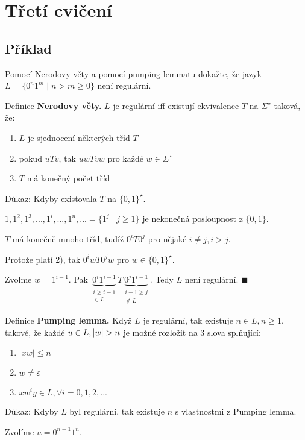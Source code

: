\section{Třetí cvičení}

\subsection{Příklad}
Pomocí Nerodovy věty a pomocí pumping lemmatu dokažte, že jazyk $L = \{0^n 1^m \mid n > m \geq 0\}$ není regulární.

\noindent
Definice \textbf{Nerodovy věty.} $L$ je regulární iff existují ekvivalence $T$ na $\Sigma^\star$ taková, že:
\begin{enumerate}[1), noitemsep]
    \item $L$ je sjednocení některých tříd $T$
    \item pokud $uTv$, tak $uwTvw$ pro každé $w \in \Sigma^\star$
    \item $T$ má konečný počet tříd
\end{enumerate}
Důkaz:
Kdyby existovala $T$ na $\{0,1\}^\star$.

$1, 1^2, 1^3, ..., 1^i, ..., 1^n, ... = \{1^j \mid j \geq 1\}$ je nekonečná posloupnost z $\{0,1\}$.

$T$ má konečně mnoho tříd, tudíž $0^i T 0^j$ pro nějaké $i \not= j, i>j$.

Protože platí 2), tak $0^i w T 0^j w$ pro $w \in \{0,1\}^\star$.

Zvolme $w = 1^{i-1}$. Pak $\underbrace{0^i 1^{i-1}}_{\substack{i \geq i-1 \\ \in L}} T 
\underbrace{0^j 1^{i-1}}_{\substack{i-1 \geq j  \\\not\in L }}$. Tedy $L$ není regulární. $\blacksquare$

\noindent
Definice \textbf{Pumping lemma.} Když $L$ je regulární, tak existuje $n \in L, n \geq 1$, takové, že každé ${u \in L},\\
|w| > n$ je 
možné rozložit na 3 slova splňující:
\begin{enumerate}[1), noitemsep]
    \item $|xw| \leq n$
    \item $w \not= \varepsilon$
    \item $xw^i y \in L, \forall i = 0, 1, 2, ...$
\end{enumerate}
Důkaz:
Kdyby $L$ byl regulární, tak existuje $n$ s vlastnostmi z Pumping lemma.

Zvolíme $u = 0^{n+1} 1^n$.

